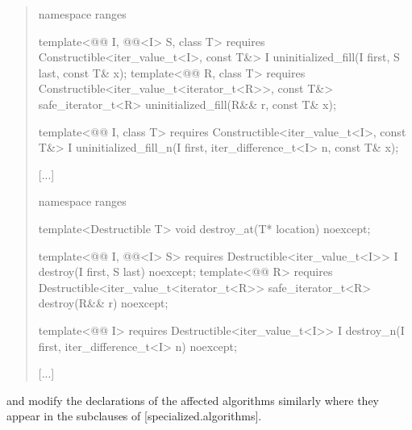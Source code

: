 \begin{quote}
\begin{codeblock}
  [...]

  namespace ranges {
    template<@@ I,
             @@<I> S, class T>
        requires Constructible<iter_value_t<I>, const T&>
      I uninitialized_fill(I first, S last, const T& x);
    template<@@ R, class T>
        requires Constructible<iter_value_t<iterator_t<R>>, const T&>
      safe_iterator_t<R> uninitialized_fill(R&& r, const T& x);

    template<@@ I, class T>
        requires Constructible<iter_value_t<I>, const T&>
      I uninitialized_fill_n(I first, iter_difference_t<I> n, const T& x);
  }

  [...]

  namespace ranges {
    template<Destructible T>
      void destroy_at(T* location) noexcept;

    template<@@ I,
             @@<I> S>
        requires Destructible<iter_value_t<I>>
      I destroy(I first, S last) noexcept;
    template<@@ R>
        requires Destructible<iter_value_t<iterator_t<R>>
      safe_iterator_t<R> destroy(R&& r) noexcept;

    template<@@ I>
        requires Destructible<iter_value_t<I>>
      I destroy_n(I first, iter_difference_t<I> n) noexcept;
  }

  [...]
\end{codeblock}
\end{quote}
and modify the declarations of the affected algorithms similarly where they
appear in the subclauses of [specialized.algorithms].

